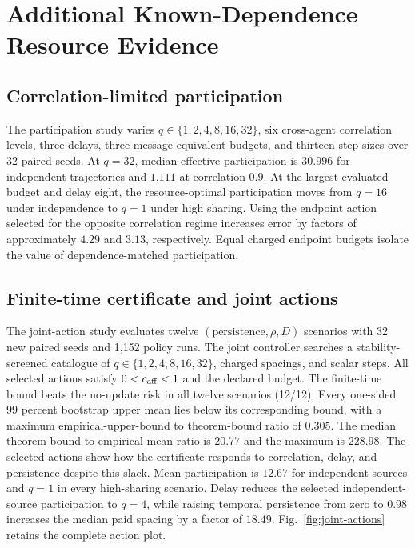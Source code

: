 \section{Additional Known-Dependence Resource Evidence}
\subsection{Correlation-limited participation}
The participation study varies $q\in\{1,2,4,8,16,32\}$, six cross-agent correlation levels, three delays, three message-equivalent budgets, and thirteen step sizes over 32 paired seeds.
At $q=32$, median effective participation is $30.996$ for independent trajectories and $1.111$ at correlation $0.9$.
At the largest evaluated budget and delay eight, the resource-optimal participation moves from $q=16$ under independence to $q=1$ under high sharing.
Using the endpoint action selected for the opposite correlation regime increases error by factors of approximately $4.29$ and $3.13$, respectively.
Equal charged endpoint budgets isolate the value of dependence-matched participation.

\subsection{Finite-time certificate and joint actions}
The joint-action study evaluates twelve $(\text{persistence},\rho,D)$ scenarios with 32 new paired seeds and 1,152 policy runs.
The joint controller searches a stability-screened catalogue of $q\in\{1,2,4,8,16,32\}$, charged spacings, and scalar steps.
All selected actions satisfy $0<c_{\rm aff}<1$ and the declared budget.
The finite-time bound beats the no-update risk in all twelve scenarios (12/12).
Every one-sided 99 percent bootstrap upper mean lies below its corresponding bound, with a maximum empirical-upper-bound to theorem-bound ratio of $0.305$.
The median theorem-bound to empirical-mean ratio is $20.77$ and the maximum is $228.98$.
The selected actions show how the certificate responds to correlation, delay, and persistence despite this slack.
Mean participation is $12.67$ for independent sources and $q=1$ in every high-sharing scenario.
Delay reduces the selected independent-source participation to $q=4$, while raising temporal persistence from zero to $0.98$ increases the median paid spacing by a factor of $18.49$.
Fig.~\ref{fig:joint-actions} retains the complete action plot.

